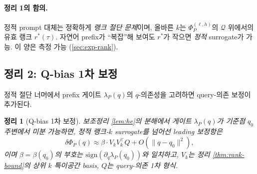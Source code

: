\documentclass[11pt]{article}
\newtheorem{theorem}{정리}
\theoremstyle{definition}
\newcommand{\Phip}{\Phi_P}
\begin{document}
\paragraph{정리 1의 함의.}
정적 prompt 대체는 정확하게 \emph{랭크 절단 문제}이며, 올바른 $k$는 $\Phip^{(\ell,h)}$의 $\mathcal{Q}$ 위에서의 유효 랭크 $r^*(\tau)$. 자연어 prefix가 ``복잡''해 보여도 $r^*$가 작으면 \emph{정적} surrogate가 가능. 이 양은 측정 가능 (\cref{sec:exp-rank}).

\subsection{정리 2: Q-bias 1차 보정}
\label{sec:thm2}

정적 절단 너머에서 prefix 게이트 $\lambda_P(q)$의 $q$-의존성을 고려하면 query-의존 보정이 추가된다.

\begin{theorem}[Q-bias 1차 보정]
\label{thm:qbias}
보조정리 \ref{lem:he}의 분해에서 게이트 $\lambda_P(q)$가 기준점 $q_0$ 주변에서 미분 가능하면, 정적 랭크-$k$ surrogate를 넘어선 leading 보정항은
\begin{equation}
\delta\Phip(q) \approx \beta \cdot V_k V_k^\top Q + O(\|q-q_0\|^2),
\label{eq:qbias-correction}
\end{equation}
이며 $\beta = \beta(q_0)$의 부호는 $\mathrm{sign}(\partial_q \lambda_P(q_0))$와 일치하고, $V_k$는 정리 \ref{thm:rank-bound}의 상위 $k$ 특이공간 basis, $Q$는 query-의존 1차 형식.
\end{theorem}
\end{document}
